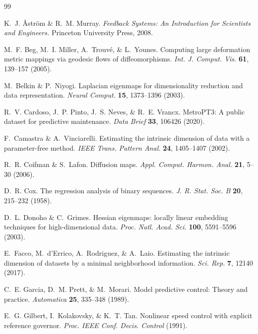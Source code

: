 \documentclass[11pt]{article}
\begin{document}
\begin{thebibliography}{99}

K.~J. {\AA}str{\"o}m \& R.~M. Murray.
\emph{Feedback Systems: An Introduction for Scientists and Engineers.}
Princeton University Press, 2008.

M.~F. Beg, M.~I. Miller, A.~Trouv{\'e}, \& L.~Younes.
Computing large deformation metric mappings via geodesic flows of
diffeomorphisms.
\emph{Int. J. Comput. Vis.} \textbf{61}, 139--157 (2005).

M.~Belkin \& P.~Niyogi.
Laplacian eigenmaps for dimensionality reduction and data representation.
\emph{Neural Comput.} \textbf{15}, 1373--1396 (2003).

R.~V. Cardoso, J.~P. Pinto, J.~S. Neves, \& R.~E. Vrancx.
MetroPT3: A public dataset for predictive maintenance.
\emph{Data Brief} \textbf{33}, 106426 (2020).

F.~Camastra \& A.~Vinciarelli.
Estimating the intrinsic dimension of data with a parameter-free method.
\emph{IEEE Trans. Pattern Anal.} \textbf{24}, 1405--1407 (2002).

R.~R. Coifman \& S.~Lafon.
Diffusion maps.
\emph{Appl. Comput. Harmon. Anal.} \textbf{21}, 5--30 (2006).

D.~R. Cox.
The regression analysis of binary sequences.
\emph{J. R. Stat. Soc. B} \textbf{20}, 215--232 (1958).

D.~L. Donoho \& C.~Grimes.
Hessian eigenmaps: locally linear embedding techniques for
high-dimensional data.
\emph{Proc. Natl. Acad. Sci.} \textbf{100}, 5591--5596 (2003).

E.~Facco, M.~d'Errico, A.~Rodriguez, \& A.~Laio.
Estimating the intrinsic dimension of datasets by a minimal
neighborhood information.
\emph{Sci. Rep.} \textbf{7}, 12140 (2017).

C.~E. Garcia, D.~M. Prett, \& M.~Morari.
Model predictive control: Theory and practice.
\emph{Automatica} \textbf{25}, 335--348 (1989).

E.~G. Gilbert, I.~Kolakovsky, \& K.~T. Tan.
Nonlinear speed control with explicit reference governor.
\emph{Proc. IEEE Conf. Decis. Control} (1991).


\end{thebibliography}
\end{document}
